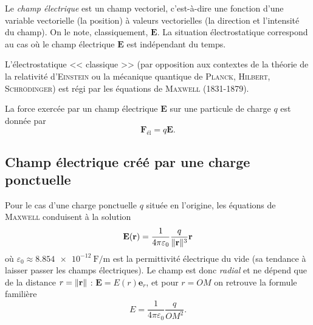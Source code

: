 \documentclass{article}
\renewcommand{\vec}[1]{\boldsymbol{\mathbf{#1}}}
\renewcommand\epsilon\varepsilon
\DeclarePairedDelimiter{\norm}{\lVert}{\rVert}
\theoremstyle{definition}
\theoremstyle{remark}
\begin{document}
Le \textit{champ électrique} est un champ vectoriel, c'est-à-dire une fonction d'une variable vectorielle (la position) à valeurs vectorielles (la direction et l'intensité du champ). On le note, classiquement, $\vec{E}$. La situation électrostatique correspond au cas où le champ électrique $\vec{E}$ est indépendant du temps.

L'électrostatique << classique >> (par opposition aux contextes de la théorie de la relativité d'\textsc{Einstein} ou la mécanique quantique de \textsc{Planck}, \textsc{Hilbert}, \textsc{Schrödinger}) est régi par les équations de \textsc{Maxwell} (1831-1879). 


La force exercée par un champ électrique $\vec{E}$ sur une particule de charge $q$ est donnée par
	\[ \vec{F}_\mathrm{él} = q\vec{E}. \]

\subsection{Champ électrique créé par une charge ponctuelle}

Pour le cas d'une charge ponctuelle $q$ située en l'origine, les équations de \textsc{Maxwell} conduisent à la solution
	\[ \vec{E}(\vec{r}) = \frac{1}{4\pi\epsilon_0}\frac{q}{\norm{\vec{r}}^3}\vec{r} \]
où $\epsilon_0\approx\SI{8.854e-12}{\farad\per\meter}$ est la permittivité électrique du vide (sa tendance à laisser passer les champs électriques). Le champ est donc \textit{radial} et ne dépend que de la distance $r=\norm{\vec{r}}$ : $\vec{E} = E(r)\vec{e}_r$, et pour $r = OM$ on retrouve la formule familière
	\[
    E = \frac{1}{4\pi\epsilon_0}\frac{q}{{OM}^2}.
    \]
\end{document}
